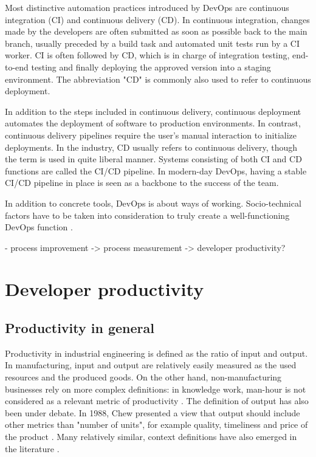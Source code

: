 Most distinctive automation practices introduced by DevOps are continuous integration (CI) and continuous delivery (CD). In continuous integration, changes made by the developers are often submitted as soon as possible back to the main branch, usually preceded by a build task and automated unit tests run by a CI worker. CI is often followed by CD, which is in charge of integration testing, end-to-end testing and finally deploying the approved version into a staging environment. The abbreviation "CD" is commonly also used to refer to continuous deployment. 

In addition to the steps included in continuous delivery, continuous deployment automates the deployment of software to production environments. In contrast, continuous delivery pipelines require the user's manual interaction to initialize deployments. In the industry, CD usually refers to continuous delivery, though the term is used in quite liberal manner. Systems consisting of both CI and CD functions are called the CI/CD pipeline. In modern-day DevOps, having a stable CI/CD pipeline in place is seen as a backbone to the success of the team. 

In addition to concrete tools, DevOps is about ways of working. Socio-technical factors have to be taken into consideration to truly create a well-functioning DevOps function \cite{hemon-hildgen_agile_2020}. 


- process improvement -> process measurement -> developer productivity?

\section{Developer productivity}

\subsection{Productivity in general}
Productivity in industrial engineering is defined as the ratio of input and output\cite{syverson_what_2011, chew_no-nonsense_1988}. In manufacturing, input and output are relatively easily measured as the used resources and the produced goods. On the other hand, non-manufacturing businesses rely on more complex definitions: in knowledge work, man-hour is not considered as a relevant metric of productivity \cite{tangen_demystifying_2005}. The definition of output has also been under debate. In 1988, Chew presented a view that output should include other metrics than "number of units", for example quality, timeliness and price of the product \cite{chew_no-nonsense_1988}. Many relatively similar, context definitions have also emerged in the literature \cite{tangen_demystifying_2005}.

